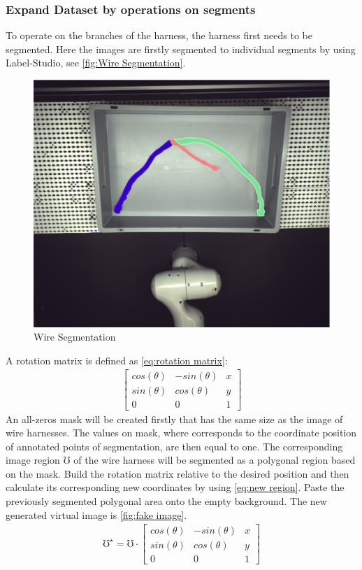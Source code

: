 \subsubsection{Expand Dataset by operations on segments} 
	To operate on the branches of the harness, the harness first needs to be segmented. Here the images are firstly segmented to individual segments by using
	Label-Studio, see \autoref{fig:Wire Segmentation}.\\
	\begin{figure}
		\centering
		\includegraphics[width=0.6\linewidth]{example_images/img_0_segment}
		\caption{Wire Segmentation}
		\label{fig:Wire Segmentation}
	\end{figure}
	A rotation matrix is defined as \autoref{eq:rotation matrix}:
	\begin{align}
		\begin{bmatrix}
			cos(\theta)&  -sin(\theta )&x \\
			sin(\theta )&  cos(\theta )&y  \\
			0&  0&1
		\end{bmatrix} \label{eq:rotation matrix}
	\end{align}
	An all-zeros mask will be created firstly that has the same size as the image of wire harnesses. The values on mask, where corresponds to the coordinate position of
	annotated points of segmentation, are then equal to one. The corresponding image region $\mho$ of the wire harness will be segmented as a polygonal region based on the mask.
	Build the rotation matrix relative to the desired position and then calculate its corresponding new coordinates by using \autoref{eq:new region}. 
	Paste the previously segmented polygonal area onto the empty background. The new generated virtual image is \autoref{fig:fake image}.
	\begin{align}
		\mho ^{\star } = \mho \cdot \begin{bmatrix}
			cos(\theta)&  -sin(\theta )&x \\
			sin(\theta )&  cos(\theta )&y  \\
			0&  0&1
		\end{bmatrix} \label{eq:new region}
	\end{align}

